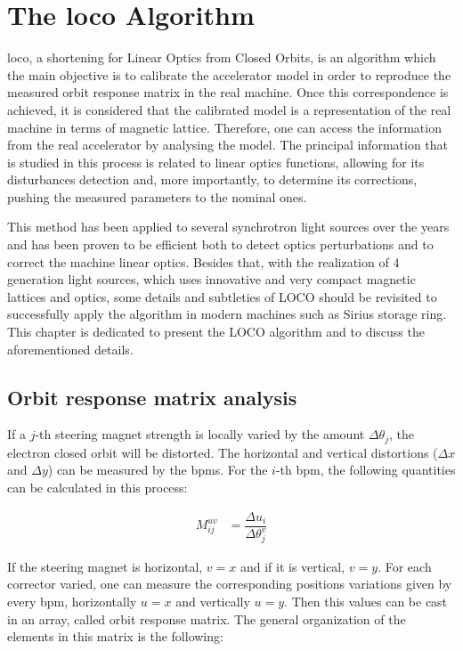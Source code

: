 \chapter{The \gls{loco} Algorithm}

\gls{loco}, a shortening for Linear Optics from Closed Orbits, is an algorithm which the main objective is to calibrate the accelerator model in order to reproduce the measured orbit response matrix in the real machine. Once this correspondence is achieved, it is considered that the calibrated model is a representation of the real machine in terms of magnetic lattice. Therefore, one can access the information from the real accelerator by analysing the model. The principal information that is studied in this process is related to linear optics functions, allowing for its disturbances detection and, more importantly, to determine its corrections, pushing the measured parameters to the nominal ones.

This method has been applied to several synchrotron light sources over the years and has been proven to be efficient both to detect optics perturbations and to correct the machine linear optics. Besides that, with the realization of 4 generation light sources, which uses innovative and very compact magnetic lattices and optics, some details and subtleties of LOCO should be revisited to successfully apply the algorithm in modern machines such as Sirius storage ring. This chapter is dedicated to present the LOCO algorithm and to discuss the aforementioned details.

\section{Orbit response matrix analysis}

If a $j$-th steering magnet strength is locally varied by the amount $\Delta \theta_j$, the electron closed orbit will be distorted. The horizontal and vertical distortions ($\Delta x$ and $\Delta y$) can be measured by the \gls{bpm}s. For the $i$-th \gls{bpm}, the following quantities can be calculated in this process:

\begin{align}
    M^{uv}_{ij} &= \dfrac{\Delta u_i}{\Delta \theta_j^v}
\end{align}

If the steering magnet is horizontal, $v=x$ and if it is vertical, $v=y$. For each corrector varied, one can measure the corresponding positions variations given by every \gls{bpm}, horizontally $u=x$ and vertically $u=y$. Then this values can be cast in an array, called orbit response matrix. The general organization of the elements in this matrix is the following:

